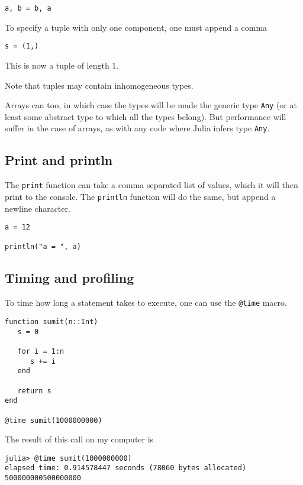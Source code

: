\documentclass[a4paper,10pt]{article}
\newcommand{\code}{\lstinline}
\begin{document}
{\begin{lstlisting}
a, b = b, a
\end{lstlisting}

To specify a tuple with only one component, one must append a comma

\begin{lstlisting}
s = (1,)
\end{lstlisting}

This is now a tuple of length 1.

Note that tuples may contain inhomogeneous types. 

Arrays can too, in which case the types will be made the generic type \code{Any} (or
at least some abstract type to which all the types belong). 
But performance will suffer in the case of arrays, as with any code where Julia infers
type \code{Any}.

\subsection{Print and println}

The \code{print} function can take a comma separated list of values, which it will
then print to the console. The \code{println} function will do the same, but append
a newline character.

\begin{lstlisting}
a = 12

println("a = ", a)
\end{lstlisting}

\subsection{Timing and profiling}

To time how long a statement takes to execute, one can use the \code{@time} macro.

\begin{lstlisting}
function sumit(n::Int)
   s = 0

   for i = 1:n
      s += i
   end

   return s
end

@time sumit(1000000000)
\end{lstlisting}

The result of this call on my computer is

\begin{verbatim}
julia> @time sumit(1000000000)
elapsed time: 0.914578447 seconds (78060 bytes allocated)
500000000500000000
\end{verbatim}

}
\end{document}
